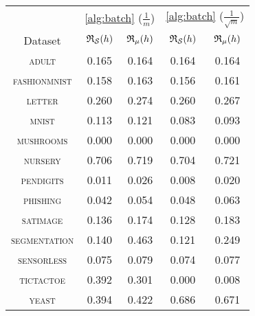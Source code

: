 \begin{tabular}{c|cc|cc}
\toprule
 & \multicolumn{2}{c}{\cref{alg:batch} {\small ($\frac{1}{m}$)}} & \multicolumn{2}{c}{\cref{alg:batch} {\small ($\frac{1}{\sqrt{m}}$)}} \\
Dataset & {\scriptsize $\mathfrak{R}_{\mathcal{S}}(h)$} & {\scriptsize $\mathfrak{R}_{\mu}(h)$} & {\scriptsize $\mathfrak{R}_{\mathcal{S}}(h)$} & {\scriptsize $\mathfrak{R}_{\mu}(h)$} \\
\midrule
\textsc{\footnotesize adult} & 0.165 & 0.164 & 0.164 & 0.164 \\
\textsc{\footnotesize fashionmnist} & 0.158 & 0.163 & 0.156 & 0.161 \\
\textsc{\footnotesize letter} & 0.260 & 0.274 & 0.260 & 0.267 \\
\textsc{\footnotesize mnist} & 0.113 & 0.121 & 0.083 & 0.093 \\
\textsc{\footnotesize mushrooms} & 0.000 & 0.000 & 0.000 & 0.000 \\
\textsc{\footnotesize nursery} & 0.706 & 0.719 & 0.704 & 0.721 \\
\textsc{\footnotesize pendigits} & 0.011 & 0.026 & 0.008 & 0.020 \\
\textsc{\footnotesize phishing} & 0.042 & 0.054 & 0.048 & 0.063 \\
\textsc{\footnotesize satimage} & 0.136 & 0.174 & 0.128 & 0.183 \\
\textsc{\footnotesize segmentation} & 0.140 & 0.463 & 0.121 & 0.249 \\
\textsc{\footnotesize sensorless} & 0.075 & 0.079 & 0.074 & 0.077 \\
\textsc{\footnotesize tictactoe} & 0.392 & 0.301 & 0.000 & 0.008 \\
\textsc{\footnotesize yeast} & 0.394 & 0.422 & 0.686 & 0.671 \\
\bottomrule
\end{tabular}
